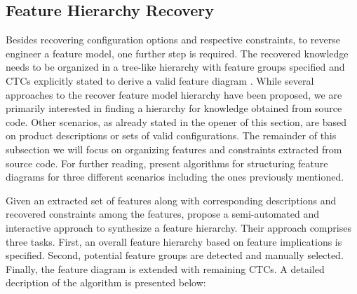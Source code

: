 \subsection{Feature Hierarchy Recovery} 
Besides recovering configuration options and respective constraints, to reverse
engineer a feature model, one further step is required. The recovered knowledge
needs to be organized in a tree-like hierarchy with feature groups specified and
CTCs explicitly stated to derive a valid feature diagram 
\citep{kang_feature-oriented_1990}.
While several approaches to the recover feature model hierarchy have been proposed, we are primarily interested in finding a hierarchy for knowledge obtained from
source code. Other scenarios, as already stated in the opener of this section,
are based on product descriptions or sets of valid configurations. The remainder of
this subsection we will focus on organizing features and constraints extracted
from source code. For further reading, \cite{andersen_efficient_2012} present
algorithms for structuring feature diagrams for three different scenarios including the
ones previously mentioned.

Given an extracted set of features along with corresponding descriptions and
recovered constraints among the features, \cite{she_reverse_2011} propose a
semi-automated and interactive approach to synthesize a feature hierarchy.
Their approach comprises three tasks. First, an overall feature hierarchy based
on feature implications is specified. Second, potential feature groups are
detected and manually selected. Finally, the feature diagram is extended with
remaining CTCs. A detailed decription of the algorithm is presented below:

